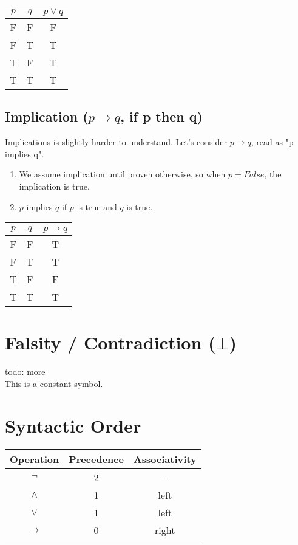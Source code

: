 \documentclass{article}
\theoremstyle{definition}
\begin{document}
  \begin{table}[H]
    \centering
    \begin{tabular}{c|c|c}
      $p$ & $q$ & $p \lor q$ \\
      \hline
      F & F & F \\
      F & T & T \\
      T & F & T \\
      T & T & T \\
    \end{tabular}
  \end{table}

  \subsection{Implication ($p \rightarrow q$, if p then q)}
  Implications is slightly harder to understand. Let's consider $p \rightarrow q$, read as "p implies q".
  \begin{enumerate}
    \item We assume implication until proven otherwise, so when $p=False$, the implication is true.
    \item $p$ implies $q$ if $p$ is true and $q$ is true.
  \end{enumerate}

  \begin{table}[H]
    \centering
    \begin{tabular}{c|c|c}
      $p$ & $q$ & $p \rightarrow q$ \\
      \hline
      F & F & T \\
      F & T & T \\
      T & F & F \\
      T & T & T \\
    \end{tabular}
  \end{table}

  \section{Falsity / Contradiction ($\bot$)}
  todo: more\\
  This is a constant symbol.

  \section{Syntactic Order}
  \begin{table}[H]
    \centering
    \begin{tabular}{c|c|c}
      Operation & Precedence & Associativity \\
      \hline
      $\neg$ &2 & -\\
      $\wedge$ & 1 & left \\
      $\lor$ & 1 & left \\
      $\rightarrow$ & 0 & right \\
    \end{tabular}
  \end{table}
\end{document}
